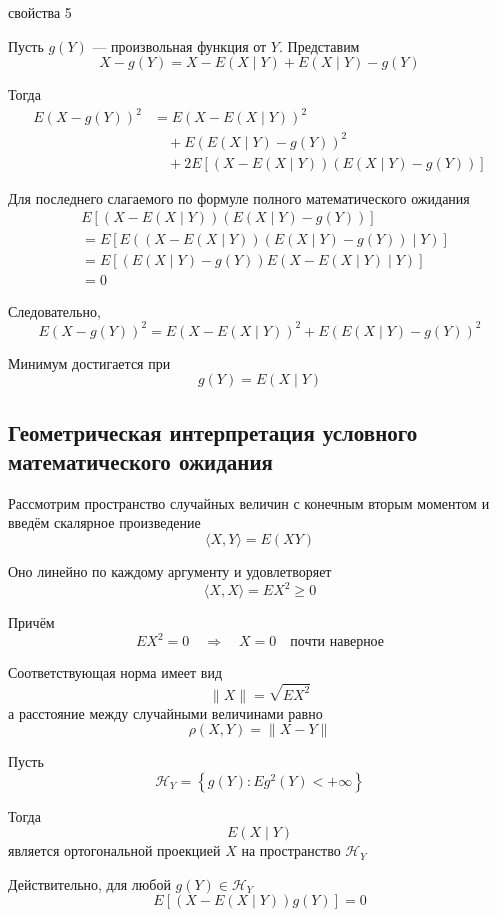 \documentclass[12pt,a4paper]{article}
\begin{document}
\begin{proofbox}{свойства 5}

Пусть $g(Y)$ --- произвольная функция от $Y$. Представим
\[
X-g(Y)
=
X-E(X\mid Y)+E(X\mid Y)-g(Y)
\]

Тогда
\[
\begin{aligned}
E(X-g(Y))^2
&=
E(X-E(X\mid Y))^2\\
&\quad+
E(E(X\mid Y)-g(Y))^2\\
&\quad+
2E\left[
(X-E(X\mid Y))
(E(X\mid Y)-g(Y))
\right]
\end{aligned}
\]

Для последнего слагаемого по формуле полного математического ожидания
\[
\begin{aligned}
&E\left[
(X-E(X\mid Y))
(E(X\mid Y)-g(Y))
\right]\\
&=
E\left[
E\left(
(X-E(X\mid Y))
(E(X\mid Y)-g(Y))
\mid Y
\right)
\right]\\
&=
E\left[
(E(X\mid Y)-g(Y))
E(X-E(X\mid Y)\mid Y)
\right]\\
&=
0
\end{aligned}
\]

Следовательно,
\[
E(X-g(Y))^2
=
E(X-E(X\mid Y))^2
+
E(E(X\mid Y)-g(Y))^2
\]

Минимум достигается при
\[
g(Y)=E(X\mid Y)
\]

\end{proofbox}

\subsection{Геометрическая интерпретация условного математического ожидания}

Рассмотрим пространство случайных величин с конечным вторым моментом и введём скалярное произведение
\[
\langle X,Y\rangle
=
E(XY)
\]

Оно линейно по каждому аргументу и удовлетворяет
\[
\langle X,X\rangle
=
EX^2\geq0
\]

Причём
\[
EX^2=0
\quad\Longrightarrow\quad
X=0
\quad\text{почти наверное}
\]

Соответствующая норма имеет вид
\[
\|X\|
=
\sqrt{EX^2}
\]
а расстояние между случайными величинами равно
\[
\rho(X,Y)
=
\|X-Y\|
\]

Пусть
\[
\mathcal{H}_Y
=
\left\{
g(Y):Eg^2(Y)<+\infty
\right\}
\]

Тогда
\[
E(X\mid Y)
\]
является ортогональной проекцией $X$ на пространство $\mathcal{H}_Y$

Действительно, для любой $g(Y)\in\mathcal{H}_Y$
\[
E\left[
(X-E(X\mid Y))g(Y)
\right]
=
0
\]
\end{document}
